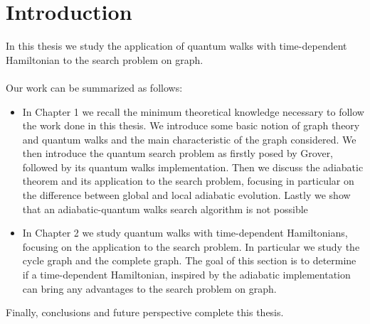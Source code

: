 \newpage
\chapter*{\textbf{Introduction}}

\vspace{-1cm}
In this thesis we study the application of quantum walks with time-dependent Hamiltonian to the search problem on graph.\\ \\

\noindent
Our work can be summarized as follows:
\begin{itemize}
  \item In Chapter 1  we recall the minimum theoretical knowledge necessary to follow the work done in this thesis. We introduce some basic notion of graph theory and quantum walks and the main characteristic of the graph considered. We then introduce the quantum search problem as firstly posed by Grover, followed by its quantum walks implementation. Then we discuss the adiabatic theorem and its application to the search problem, focusing in particular on the difference between global and local adiabatic evolution. Lastly we show that an adiabatic-quantum walks search algorithm is not possible

  \item In Chapter 2 we study quantum walks with time-dependent Hamiltonians, focusing on the application to the search problem. In particular we study the cycle graph and the complete graph. The goal of this section is to determine if a time-dependent Hamiltonian, inspired by the adiabatic implementation can bring any advantages to the search problem on graph.


\end{itemize}
Finally, conclusions and future perspective complete this thesis.
